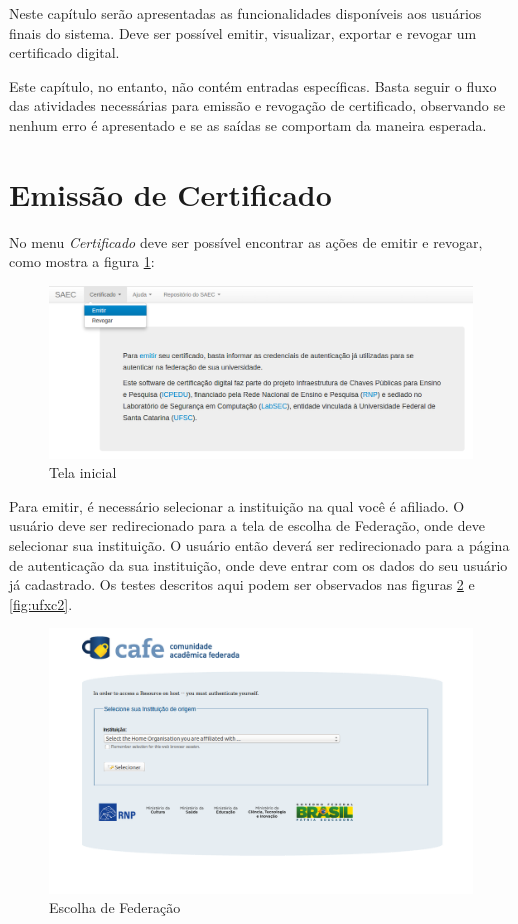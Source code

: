 Neste capítulo serão apresentadas as funcionalidades disponíveis aos usuários finais do sistema.
Deve ser possível emitir, visualizar, exportar e revogar um certificado digital.

Este capítulo, no entanto, não contém entradas específicas. Basta seguir o fluxo das atividades necessárias para emissão e revogação de certificado, observando se nenhum erro é apresentado e se as saídas se comportam da maneira esperada.

\section{Emissão de Certificado}

No menu \textit{Certificado} deve ser possível encontrar as ações de emitir e revogar, como mostra a figura \ref{fig:emirevog}:

\begin{figure}[ht]
     \centering
     \includegraphics[scale=0.4]{images/emitir1.png}
     \caption{Tela inicial}
     \label{fig:emirevog}
\end{figure}

Para emitir, é necessário selecionar a instituição na qual você é afiliado.  O usuário deve ser redirecionado para a tela de escolha de Federação, onde deve selecionar sua instituição. O usuário então deverá ser redirecionado para a página de autenticação da sua instituição, onde deve entrar com os dados do seu usuário já cadastrado. Os testes descritos aqui podem ser observados nas figuras \ref{fig:ufxc} e \ref{fig:ufxc2}.

\begin{figure}[ht]
     \centering
     \includegraphics[scale=0.3]{images/escolher-federacao.png}
     \caption{Escolha de Federação}
     \label{fig:ufxc}
\end{figure}

